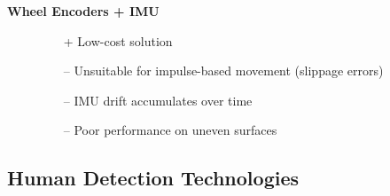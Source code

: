 \begin{description}
\item[\textbf{Wheel Encoders + IMU}]
\hfill
\begin{itemize}[leftmargin=*,nosep]
    \item[+] Low-cost solution
    \item[--] Unsuitable for impulse-based movement (slippage errors)
    \item[--] IMU drift accumulates over time
    \item[--] Poor performance on uneven surfaces
\end{itemize}
\end{description}

\subsection*{Human Detection Technologies}

